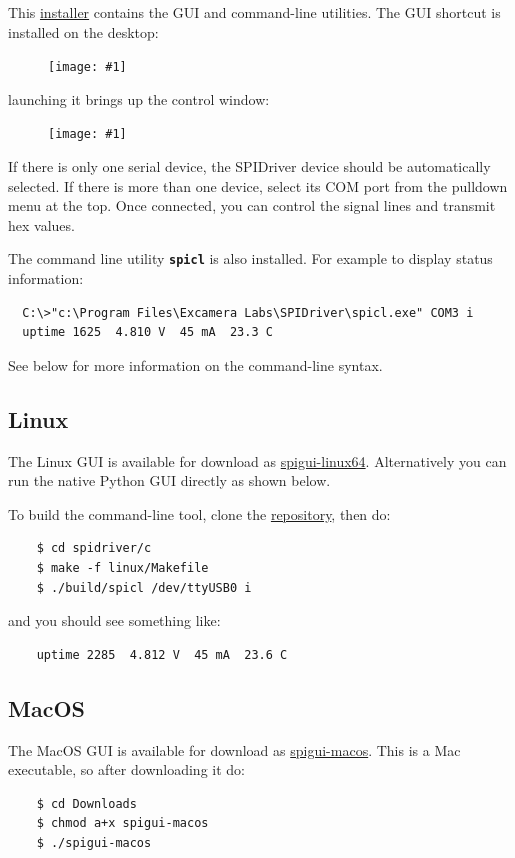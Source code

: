 \documentclass{article}
\newcommand{\png}[1]{
\begin{figure}[H]
\begin{center}
\texttt{[image: \#1]}
\end{center}
\end{figure}
}
\newcommand{\mach}[1]{\texttt{\textbf{#1}}}
\begin{document}
This
\href{https://spidriver.com/windows}{installer}
contains the GUI and command-line utilities.
The GUI shortcut is installed on the desktop:

\png{img/spidriver/icon}

launching it brings up the control window:

\png{img/spidriver/gui}

If there is only one serial device, 
the SPIDriver device should be automatically selected.
If there is more than one device, select its COM port from the pulldown menu at the top.
Once connected, you can control the signal lines and transmit hex values.

The command line utility \mach{spicl} is also installed. For example to display status information:

\begin{lstlisting}
  C:\>"c:\Program Files\Excamera Labs\SPIDriver\spicl.exe" COM3 i
  uptime 1625  4.810 V  45 mA  23.3 C
\end{lstlisting}

See below for more information on the command-line syntax.

\subsection{Linux}

The Linux GUI is available for download as
\href{https://spidriver.com/linux}{spigui-linux64}.
Alternatively you can run the native Python GUI directly as shown below.

To build the command-line tool, clone the
\href{https://github.com/jamesbowman/spidriver}{repository}, then do:
\begin{lstlisting}
    $ cd spidriver/c
    $ make -f linux/Makefile
    $ ./build/spicl /dev/ttyUSB0 i
\end{lstlisting}
and you should see something like:

\begin{lstlisting}
    uptime 2285  4.812 V  45 mA  23.6 C
\end{lstlisting}

\subsection{MacOS}

The MacOS GUI is available for download as
\href{https://spidriver.com/mac}{spigui-macos}.
This is a Mac executable, so after downloading it do:
\begin{lstlisting}
    $ cd Downloads
    $ chmod a+x spigui-macos
    $ ./spigui-macos
\end{lstlisting}
\end{document}
